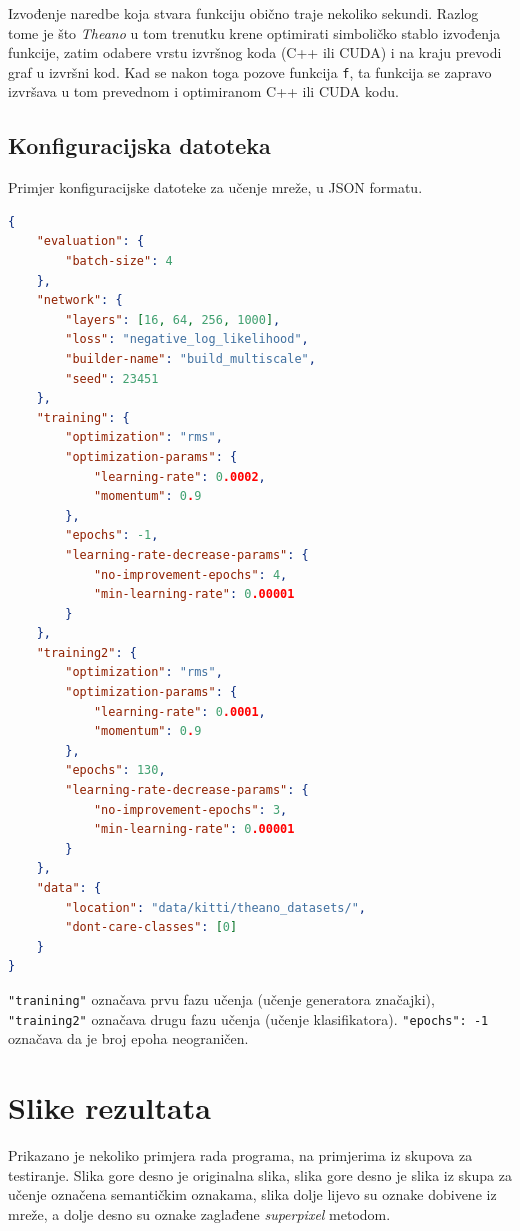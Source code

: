 \documentclass[times, utf8, diplomski, numeric]{fer}
\begin{document}
Izvođenje naredbe koja stvara funkciju obično traje nekoliko sekundi. Razlog tome je što \textit{Theano} u tom trenutku krene optimirati simboličko stablo izvođenja funkcije, zatim odabere vrstu izvršnog koda (C++ ili CUDA) i na kraju prevodi graf u izvršni kod. Kad se nakon toga pozove funkcija \texttt{f}, ta funkcija se zapravo izvršava u tom prevednom i optimiranom C++ ili CUDA kodu.


\section{Konfiguracijska datoteka}
\label{chap:konfiguracijska datoteka}

Primjer konfiguracijske datoteke za učenje mreže, u JSON formatu.
\begin{lstlisting}[language=json]
{
    "evaluation": {
        "batch-size": 4
    },
    "network": {
        "layers": [16, 64, 256, 1000],
        "loss": "negative_log_likelihood",
        "builder-name": "build_multiscale",
        "seed": 23451
    },
    "training": {
        "optimization": "rms",
        "optimization-params": {
            "learning-rate": 0.0002,
            "momentum": 0.9
        },
        "epochs": -1,
        "learning-rate-decrease-params": {
            "no-improvement-epochs": 4,
            "min-learning-rate": 0.00001
        }
    },
    "training2": {
        "optimization": "rms",
        "optimization-params": {
            "learning-rate": 0.0001,
            "momentum": 0.9
        },
        "epochs": 130,
        "learning-rate-decrease-params": {
            "no-improvement-epochs": 3,
            "min-learning-rate": 0.00001
        }
    },
    "data": {
        "location": "data/kitti/theano_datasets/",
        "dont-care-classes": [0]
    }
}
\end{lstlisting}
\texttt{"tranining"} označava prvu fazu učenja (učenje generatora značajki), \texttt{"training2"} označava drugu fazu učenja (učenje klasifikatora). \texttt{"epochs": -1} označava da je broj epoha neograničen.

\chapter{Slike rezultata}
Prikazano je nekoliko primjera rada programa, na primjerima iz skupova za testiranje. Slika gore desno je originalna slika, slika gore desno je slika iz skupa za učenje označena semantičkim oznakama, slika dolje lijevo su oznake dobivene iz mreže, a dolje desno su oznake zaglađene \textit{superpixel} metodom.
\end{document}
